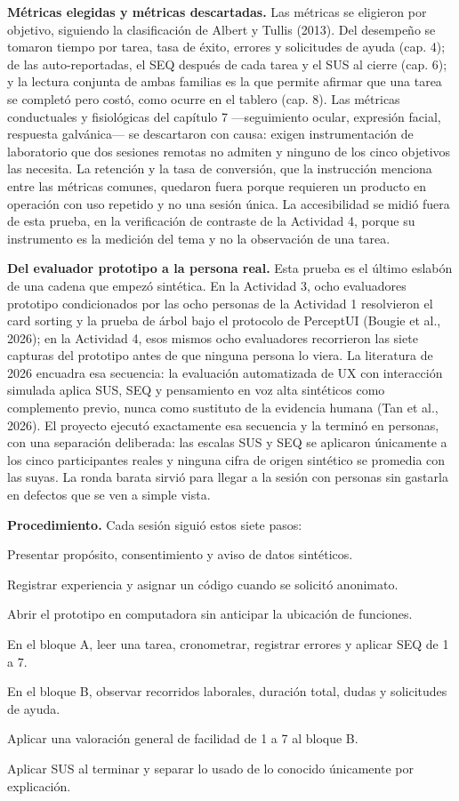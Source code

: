 \textbf{Métricas elegidas y métricas descartadas.} Las métricas se eligieron por objetivo,
siguiendo la clasificación de Albert y Tullis (2013). Del desempeño se tomaron tiempo por tarea,
tasa de éxito, errores y solicitudes de ayuda (cap. 4); de las auto-reportadas, el SEQ después de
cada tarea y el SUS al cierre (cap. 6); y la lectura conjunta de ambas familias es la que permite
afirmar que una tarea se completó pero costó, como ocurre en el tablero (cap. 8). Las métricas
conductuales y fisiológicas del capítulo 7 ---seguimiento ocular, expresión facial, respuesta
galvánica--- se descartaron con causa: exigen instrumentación de laboratorio que dos sesiones
remotas no admiten y ninguno de los cinco objetivos las necesita. La retención y la tasa de
conversión, que la instrucción menciona entre las métricas comunes, quedaron fuera porque
requieren un producto en operación con uso repetido y no una sesión única. La accesibilidad se
midió fuera de esta prueba, en la verificación de contraste de la Actividad 4, porque su
instrumento es la medición del tema y no la observación de una tarea.

\textbf{Del evaluador prototipo a la persona real.} Esta prueba es el último eslabón de una cadena
que empezó sintética. En la Actividad 3, ocho evaluadores prototipo condicionados por las ocho
personas de la Actividad 1 resolvieron el card sorting y la prueba de árbol bajo el protocolo de
PerceptUI (Bougie et al., 2026); en la Actividad 4, esos mismos ocho evaluadores recorrieron las
siete capturas del prototipo antes de que ninguna persona lo viera. La literatura de 2026 encuadra
esa secuencia: la evaluación automatizada de UX con interacción simulada aplica SUS, SEQ y
pensamiento en voz alta sintéticos como complemento previo, nunca como sustituto de la evidencia
humana (Tan et al., 2026). El proyecto ejecutó exactamente esa secuencia y la
terminó en personas, con una separación deliberada: las escalas SUS y SEQ se aplicaron únicamente
a los cinco participantes reales y ninguna cifra de origen sintético se promedia con las suyas.
La ronda barata sirvió para llegar a la sesión con personas sin gastarla en defectos que se ven a
simple vista.

\textbf{Procedimiento.} Cada sesión siguió estos siete pasos:

\begin{uxpreg}
  \item Presentar propósito, consentimiento y aviso de datos sintéticos.
  \item Registrar experiencia y asignar un código cuando se solicitó anonimato.
  \item Abrir el prototipo en computadora sin anticipar la ubicación de funciones.
  \item En el bloque A, leer una tarea, cronometrar, registrar errores y aplicar SEQ de 1 a 7.
  \item En el bloque B, observar recorridos laborales, duración total, dudas y solicitudes de ayuda.
  \item Aplicar una valoración general de facilidad de 1 a 7 al bloque B.
  \item Aplicar SUS al terminar y separar lo usado de lo conocido únicamente por explicación.
\end{uxpreg}

